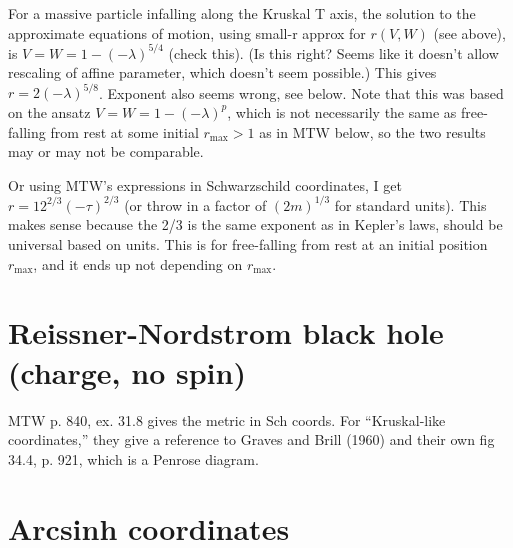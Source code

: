 \documentclass{article}
\begin{document}
For a massive particle infalling along the Kruskal T axis, the solution to the
approximate equations of motion, using small-r approx for $r(V,W)$ (see above),
is $V=W=1-(-\lambda)^{5/4}$ (check this).
(Is this right? Seems like it doesn't allow rescaling of affine parameter, which doesn't
seem possible.) This gives $r=2(-\lambda)^{5/8}$. Exponent also seems wrong, see below.
Note that this was based on the ansatz $V=W=1-(-\lambda)^p$, which is not necessarily the same
as free-falling from rest at some initial $r_\text{max}>1$ as in MTW below, so the two
results may or may not be comparable.

Or using MTW's expressions in Schwarzschild coordinates, I get
$r=12^{2/3}(-\tau)^{2/3}$ (or throw in a factor of $(2m)^{1/3}$ for
standard units). This makes sense because the 2/3 is the same exponent
as in Kepler's laws, should be universal based on units. This is for free-falling
from rest at an initial position $r_\text{max}$, and it ends up not depending
on $r_\text{max}$.

\section{Reissner-Nordstrom black hole (charge, no spin)}

MTW p. 840, ex. 31.8 gives the metric in Sch coords. For ``Kruskal-like coordinates,''
they give a reference to Graves and Brill (1960) and their own fig 34.4, p. 921,
which is a Penrose diagram.

\section{Arcsinh coordinates}
\end{document}
